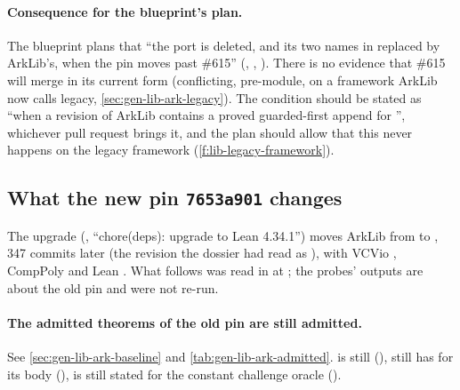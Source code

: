 \paragraph{Consequence for the blueprint's plan.} The blueprint plans that \enquote{the port is
deleted, and its two names in  replaced by ArkLib's, when the pin moves past
\#615} (, , ). There is no evidence that \#615 will merge
in its current form (conflicting, pre-module, on a framework ArkLib now calls legacy,
\cref{sec:gen-lib-ark-legacy}). The condition should be stated as \enquote{when a revision of
ArkLib contains a proved guarded-first append for },
whichever pull request brings it, and the plan should allow that this never happens on the legacy
framework (\cref{f:lib-legacy-framework}).

\subsection{What the new pin \texorpdfstring{\texttt{7653a901}}{7653a901} changes}\label{sec:gen-lib-ark-new}

The upgrade (, \enquote{chore(deps): upgrade to Lean 4.34.1}) moves ArkLib from
 to , 347 commits later (the revision the dossier had read as
), with VCVio , CompPoly  and Lean .
What follows was read in \allowbreak{}\allowbreak{} at ; the probes' outputs are
about the old pin and were not re-run.

\paragraph{The admitted theorems of the old pin are still admitted.} See
\cref{sec:gen-lib-ark-baseline} and \cref{tab:gen-lib-ark-admitted}. 
is still  (),  still has
 for its body (\allowbreak{}\allowbreak{}),
 is still stated for the constant challenge oracle
(\allowbreak{}).

